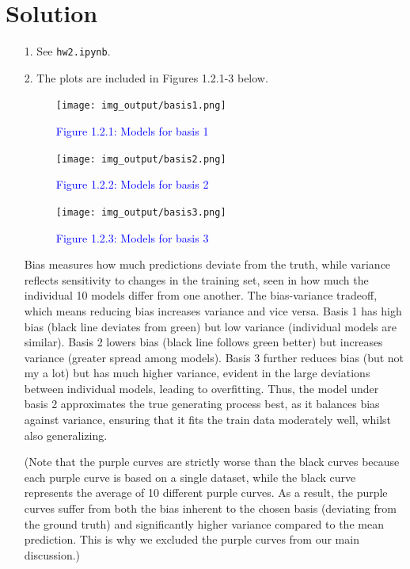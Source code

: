 \documentclass[submit]{../harvardml}
\newenvironment{solution}
  {\color{blue}\section*{Solution}}
{}
\begin{document}
\begin{solution}

\begin{enumerate}
    \item [1.] See \texttt{hw2.ipynb}.
    \item [2.] The plots are included in Figures 1.2.1-3 below.
    \begin{figure}[H]
        \centering
        \texttt{[image: img\_output/basis1.png]}
        \caption*{\textcolor{blue}{Figure 1.2.1: Models for basis 1}}
        \label{fig:q1.2a}
    \end{figure}
    \begin{figure}[H]
        \centering
        \texttt{[image: img\_output/basis2.png]}
        \caption*{\textcolor{blue}{Figure 1.2.2: Models for basis 2}}
        \label{fig:q1.2b}
    \end{figure}
    \begin{figure}[H]
        \centering
        \texttt{[image: img\_output/basis3.png]}
        \caption*{\textcolor{blue}{Figure 1.2.3: Models for basis 3}}
        \label{fig:q1.2c}
    \end{figure}
    Bias measures how much predictions deviate from the truth, while variance reflects sensitivity to changes in the training set, seen in how much the individual 10 models differ from one another. The bias-variance tradeoff, which means reducing bias increases variance and vice versa. Basis 1 has high bias (black line deviates from green) but low variance (individual models are similar). Basis 2 lowers bias (black line follows green better) but increases variance (greater spread among models). Basis 3 further reduces bias (but not my a lot) but has much higher variance, evident in the large deviations between individual models, leading to overfitting. Thus, the model under basis 2 approximates the true generating process best, as it balances bias against variance, ensuring that it fits the train data moderately well, whilst also generalizing.

    \vspace{.5em}
    (Note that the purple curves are strictly worse than the black curves because each purple curve is based on a single dataset, while the black curve represents the average of 10 different purple curves. As a result, the purple curves suffer from both the bias inherent to the chosen basis (deviating from the ground truth) and significantly higher variance compared to the mean prediction. This is why we excluded the purple curves from our main discussion.)


\end{enumerate}
\end{solution}
\end{document}
